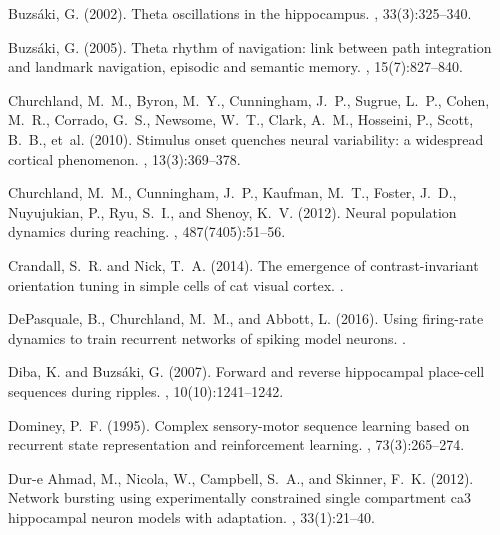 \documentclass[11pt]{article} %
\begin{document}
\begin{thebibliography}{10}
Buzs{\'a}ki, G. (2002).
\newblock Theta oscillations in the hippocampus.
, 33(3):325--340.

Buzs{\'a}ki, G. (2005).
\newblock Theta rhythm of navigation: link between path integration and
  landmark navigation, episodic and semantic memory.
, 15(7):827--840.

Churchland, M.~M., Byron, M.~Y., Cunningham, J.~P., Sugrue, L.~P., Cohen,
  M.~R., Corrado, G.~S., Newsome, W.~T., Clark, A.~M., Hosseini, P., Scott,
  B.~B., et~al. (2010).
\newblock Stimulus onset quenches neural variability: a widespread cortical
  phenomenon.
, 13(3):369--378.

Churchland, M.~M., Cunningham, J.~P., Kaufman, M.~T., Foster, J.~D.,
  Nuyujukian, P., Ryu, S.~I., and Shenoy, K.~V. (2012).
\newblock Neural population dynamics during reaching.
, 487(7405):51--56.

Crandall, S.~R. and Nick, T.~A. (2014).
\newblock The emergence of contrast-invariant orientation tuning in simple
  cells of cat visual cortex.
.

DePasquale, B., Churchland, M.~M., and Abbott, L. (2016).
\newblock Using firing-rate dynamics to train recurrent networks of spiking
  model neurons.
.

Diba, K. and Buzs{\'a}ki, G. (2007).
\newblock Forward and reverse hippocampal place-cell sequences during ripples.
, 10(10):1241--1242.

Dominey, P.~F. (1995).
\newblock Complex sensory-motor sequence learning based on recurrent state
  representation and reinforcement learning.
, 73(3):265--274.

Dur-e Ahmad, M., Nicola, W., Campbell, S.~A., and Skinner, F.~K. (2012).
\newblock Network bursting using experimentally constrained single compartment
  ca3 hippocampal neuron models with adaptation.
, 33(1):21--40.


\end{thebibliography}
\end{document}
